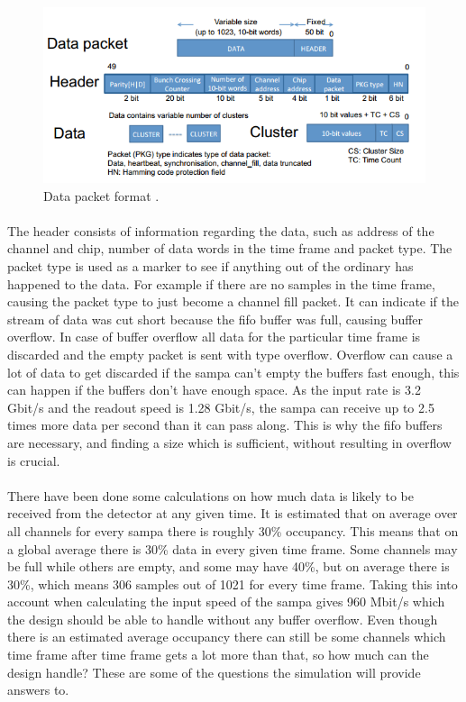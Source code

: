 \documentclass[a4paper, 12pt]{report}
\begin{document}
\begin{figure}[h!]
	\centering
		\includegraphics[width=1.0\textwidth]{images/packet.png}
		\caption[Data packet format]{Data packet format \cite{tdr-015}.}
		\label{fig:packet}
\end{figure}

\paragraph{}
The header consists of information regarding the data, such as address of the channel and chip, number of data words in the time frame and packet type.
The packet type is used as a marker to see if anything out of the ordinary has happened to the data.
For example if there are no samples in the time frame, causing the packet type to just become a channel fill packet.
It can indicate if the stream of data was cut short because the \gls{fifo} buffer was full, causing buffer overflow.
In case of buffer overflow all data for the particular time frame is discarded and the empty packet is sent with type overflow.
Overflow can cause a lot of data to get discarded if the \gls{sampa} can't empty the buffers fast enough, this can happen if the buffers don't have enough space.
As the input rate is 3.2 Gbit/s and the readout speed is 1.28 Gbit/s, the \gls{sampa} can receive up to 2.5 times more data per second than it can pass along.
This is why the \gls{fifo} buffers are necessary, and finding a size which is sufficient, without resulting in overflow is crucial.

\paragraph{}
There have been done some calculations on how much data is likely to be received from the detector at any given time.
It is estimated that on average over all channels for every \gls{sampa} there is roughly 30\% occupancy.
This means that on a global average there is 30\% data in every given time frame.
Some channels may be full while others are empty, and some may have 40\%, but on average there is 30\%, which means 306 samples out of 1021 for every time frame.
Taking this into account when calculating the input speed of the \gls{sampa} gives 960 Mbit/s which the design should be able to handle without any buffer overflow.
Even though there is an estimated average occupancy there can still be some channels which time frame after time frame gets a lot more than that, so how much can the design handle?
These are some of the questions the simulation will provide answers to.
\end{document}
